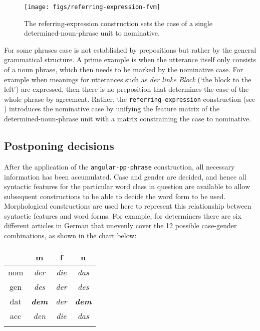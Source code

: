 \begin{figure}[t]
  \centerline{\texttt{[image: figs/referring-expression-fvm]}}
  \caption[Handling case in single determined-noun-phrases]{%
  The referring-expression construction sets the case of a
    single determined-noun-phrase unit to nominative.}
  \label{f:referring-expression-fvm}
\end{figure}

For some phrases case is not established by prepositions but
rather by the general grammatical structure. A prime example is when 
the utterance itself only consists of a noun phrase, which then needs to be marked by 
the nominative case. For example when meanings for utterances such as \textit{der
linke Block} (`the block to the left') are expressed, then there
is no preposition that determines the case of the whole
phrase by agreement. Rather, the {\footnotesize\texttt{referring-expression}}
construction (see )
introduces the nominative case by unifying the feature matrix of the
determined-noun-phrase unit with a matrix constraining the case to
nominative.

\subsection{Postponing decisions}
After the application of the {\footnotesize\tt angular-pp-phrase}
construction, all necessary information has been accumulated. Case and
gender are decided, and hence all syntactic features for the
particular word class in question are available to allow subsequent
constructions to be able to decide the word form to be used. Morphological
constructions are used here to represent this relationship between syntactic
features and word forms. For example, for determiners there
are six different articles in German that unevenly cover the 12
possible case-gender combinations, as shown in the chart below:

\begin{center}
  \begin{tabular}{cccc}
  	\lsptoprule
    & m & f & n \\ \midrule
    nom  & \emph{der} & \emph{die} & \emph{das} \\
    gen  & \emph{des} & \emph{der} & \emph{des} \\
    dat & \bf{\emph{dem}} & \emph{der} & \bf{\emph{dem}} \\
    acc & \emph{den} & \emph{die} & \emph{das} \\ 
	\lspbottomrule
  \end{tabular}
\end{center}

